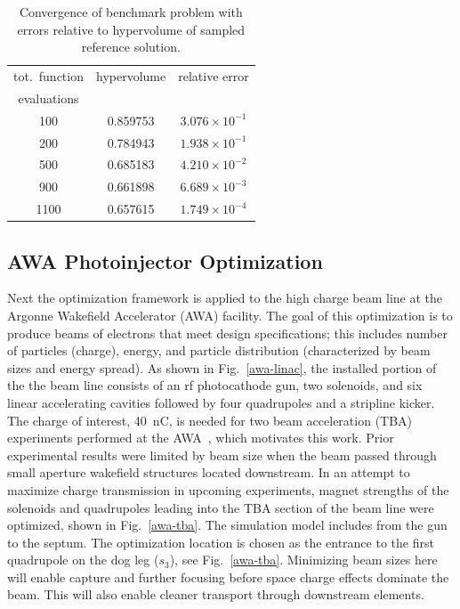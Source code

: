 \begin{table}%
\begin{center}
  \caption{Convergence of benchmark problem with errors relative to
    hypervolume of sampled reference solution.}
  \label{tbl:bench_rms_error}
  \begin{tabular}{c|c|c}
	\cline{1-3}
    tot.\ function  & hypervolume & relative error\\
    evaluations    & & \\
	\cline{1-3}
    100  &  0.859753 & $3.076 \times 10^{-1}$ \\
    200  &  0.784943 & $1.938 \times 10^{-1}$ \\
    500  &  0.685183 & $4.210 \times 10^{-2}$ \\
    900  &  0.661898 & $6.689 \times 10^{-3}$ \\
    1100 &  0.657615 & $1.749 \times 10^{-4}$ \\
	\cline{1-3}
  \end{tabular}
\end{center}
\end{table}




\subsection{AWA Photoinjector Optimization} \label{awaproblem}
Next the optimization framework is applied to the high charge beam line
 at the Argonne Wakefield Accelerator (AWA) facility. 
The goal of this optimization is to produce beams of electrons that meet 
design specifications; this includes number of particles (charge), energy, 
and particle distribution (characterized by beam sizes and energy spread).
As shown in Fig.~\ref{awa-linac}, the installed portion of the the 
beam line consists of an rf photocathode gun, 
two solenoids, and six linear accelerating cavities
followed by four quadrupoles and a stripline kicker. 
The charge of interest, \SI{40}{nC}, is needed for two beam acceleration (TBA) 
experiments performed at the AWA~\cite{gai_power_jing_2012,JING201872}, 
which motivates this work. 
Prior experimental results were limited by beam size when the beam passed through small aperture 
wakefield structures located downstream. 
In an attempt to maximize charge transmission in upcoming experiments,
magnet strengths of the solenoids and quadrupoles leading into the 
TBA section of the beam line were optimized, shown in Fig.~\ref{awa-tba}.
The simulation model includes from the gun to the septum.
The optimization location is chosen as the  
entrance to the first quadrupole on the dog leg ($s_3$), see Fig.~\ref{awa-tba}.
Minimizing beam sizes here will enable capture and further focusing before space charge effects dominate the beam. 
This will also enable cleaner transport through downstream elements.

